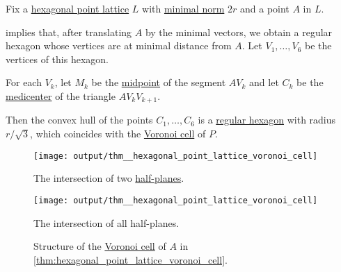 \begin{proposition}\label{thm:hexagonal_point_lattice_voronoi_cell}
  Fix a \hyperref[def:hexagonal_point_lattice]{hexagonal point lattice} \( L \) with \hyperref[def:minimal_lattice_vector]{minimal norm} \( 2r \) and a point \( A \) in \( L \).

   implies that, after translating \( A \) by the minimal vectors, we obtain a regular hexagon whose vertices are at minimal distance from \( A \). Let \( V_1, \ldots, V_6 \) be the vertices of this hexagon.

  For each \( V_k \), let \( M_k \) be the \hyperref[thm:segment_midpoint]{midpoint} of the segment \( AV_k \) and let \( C_k \) be the \hyperref[thm:medicenter]{medicenter} of the triangle \( A V_k V_{k+1} \).

  Then the convex hull of the points \( C_1, \ldots, C_6 \) is a \hyperref[def:regular_polygon]{regular hexagon} with radius \( r / {\sqrt 3} \), which coincides with the \hyperref[def:voronoi_cell]{Voronoi cell} of \( P \).

  \begin{figure}[!ht]
    \begin{subcaptionblock}[t]{0.45\linewidth}
      \centering
      \texttt{[image: output/thm\_\_hexagonal\_point\_lattice\_voronoi\_cell]}
      \caption{The intersection of two \hyperref[def:half_space]{half-planes}.}\label{fig:thm:hexagonal_point_lattice_voronoi_cell/construction}
    \end{subcaptionblock}
    \hfill
    \begin{subcaptionblock}[t]{0.45\linewidth}
      \centering
      \texttt{[image: output/thm\_\_hexagonal\_point\_lattice\_voronoi\_cell]}
      \caption{The intersection of all half-planes.}\label{fig:thm:hexagonal_point_lattice_voronoi_cell/result}
    \end{subcaptionblock}
    \caption{Structure of the \hyperref[def:voronoi_cell]{Voronoi cell} of \( A \) in \cref{thm:hexagonal_point_lattice_voronoi_cell}.}\label{fig:thm:hexagonal_point_lattice_voronoi_cell}
  \end{figure}
\end{proposition}

